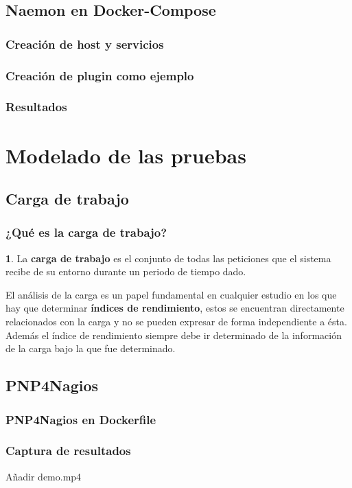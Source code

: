 \documentclass{beamer}
\theoremstyle{plain}
\theoremstyle{definition}
\newtheorem{defn}[thm]{}
\theoremstyle{plain}
\theoremstyle{definition}
\theoremstyle{remark}
\theoremstyle{definition}
\begin{document}
\subsection{Naemon en Docker-Compose}
\begin{frame}
	\frametitle{Creación de host y servicios}
	
\end{frame}
\begin{frame}
	\frametitle{Creación de plugin como ejemplo}
	
\end{frame}
\begin{frame}
	\frametitle{Resultados}
	\end{frame}


\section{Modelado de las pruebas} %
\subsection{Carga de trabajo}
\begin{frame}
	\frametitle{¿Qué es la carga de trabajo?}
	\begin{defn}
		La \textbf{carga de trabajo} es el conjunto de todas las peticiones que el sistema recibe de su entorno
		durante un periodo de tiempo dado.
	\end{defn}
El análisis de la carga es un papel fundamental en cualquier
estudio en los que hay que determinar \textbf{índices de rendimiento}, estos se
encuentran directamente relacionados con la carga y no se pueden expresar
de forma independiente a ésta. Además el índice de rendimiento siempre debe
ir determinado de la información de la carga bajo la que fue determinado.
	
\end{frame}
\subsection{PNP4Nagios}

\begin{frame}
	\frametitle{PNP4Nagios en Dockerfile}
\end{frame}
\begin{frame}
	\frametitle{Captura de resultados}
	Añadir demo.mp4
\end{frame}
\end{document}
